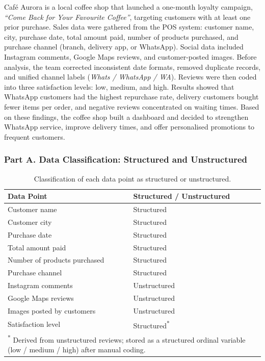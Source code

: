 \documentclass[12pt, a4paper]{article}
\newcommand{\Hcell}[1]{{\color{white}\textbf{#1}}}
\begin{document}
Caf\'{e} Aurora is a local coffee shop that launched a one-month loyalty campaign,
\textit{``Come Back for Your Favourite Coffee''}, targeting customers with at least
one prior purchase. Sales data were gathered from the POS system: customer name,
city, purchase date, total amount paid, number of products purchased, and purchase
channel (branch, delivery app, or WhatsApp). Social data included Instagram comments,
Google Maps reviews, and customer-posted images. Before analysis, the team corrected
inconsistent date formats, removed duplicate records, and unified channel labels
(\textit{Whats / WhatsApp / WA}). Reviews were then coded into three satisfaction
levels: low, medium, and high. Results showed that WhatsApp customers had the highest
repurchase rate, delivery customers bought fewer items per order, and negative reviews
concentrated on waiting times. Based on these findings, the coffee shop built a
dashboard and decided to strengthen WhatsApp service, improve delivery times, and
offer personalised promotions to frequent customers.

\subsubsection{Part A. Data Classification: Structured and Unstructured}

\begin{table}[H]
\centering
\caption{Classification of each data point as structured or unstructured.}
\label{tab:partA}
\small
\begin{tabularx}{\textwidth}{X p{5.5cm}}
\toprule
\rowcolor{aqHdr}
\Hcell{Data Point} &
\Hcell{Structured / Unstructured} \\
\midrule
Customer name                & Structured \\
\rowcolor{aqRow}
Customer city                & Structured \\
Purchase date                & Structured \\
\rowcolor{aqRow}
Total amount paid            & Structured \\
Number of products purchased & Structured \\
\rowcolor{aqRow}
Purchase channel             & Structured \\
Instagram comments           & Unstructured \\
\rowcolor{aqRow}
Google Maps reviews          & Unstructured \\
Images posted by customers   & Unstructured \\
\rowcolor{aqRow}
Satisfaction level           & Structured\textsuperscript{*} \\
\bottomrule
\multicolumn{2}{p{\textwidth}}{%
  \textsuperscript{*}\footnotesize
  Derived from unstructured reviews; stored as a structured ordinal variable
  (low / medium / high) after manual coding.}
\end{tabularx}
\end{table}
\end{document}
